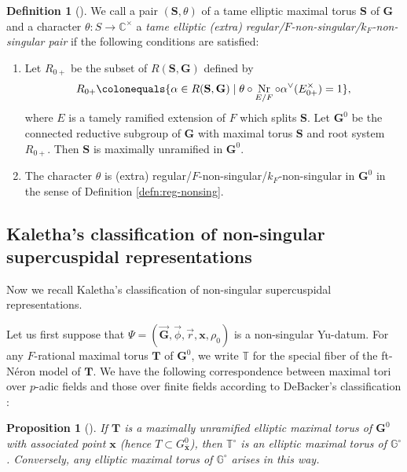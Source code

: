 \documentclass{amsart}
\newcommand{\bfT}{\mathbf{T}}
\newcommand{\x}{\mathbf{x}}
\newcommand{\bbT}{\mathbb{T}}
\newcommand{\C}{\mathbb{C}}
\newcommand{\bbG}{\mathbb{G}}
\newcommand{\bfG}{\mathbf{G}}
\newcommand{\bfS}{\mathbf{S}}
\DeclareMathOperator{\Nr}{Nr}
\theoremstyle{plain}
\newtheorem{prop}[thm]{Proposition}
\theoremstyle{definition}
\newtheorem{defn}[thm]{Definition}
\theoremstyle{remark}
\theoremstyle{theorem}
\begin{document}
\begin{defn}[{\cite[Definition 3.4.1]{Kal19-sc}}]\label{defn:non-sing-pair}
We call a pair $(\bfS,\theta)$ of a tame elliptic maximal torus $\bfS$ of $\bfG$ and a character $\theta\colon S\rightarrow\C^{\times}$ a \textit{tame elliptic (extra) regular/$F$-non-singular/$k_{F}$-non-singular pair} if the following conditions are satisfied:
\begin{enumerate}
\item
Let $R_{0+}$ be the subset of $R(\bfS,\bfG)$ defined by
\[
R_{0+}\colonequals \{\alpha\in R(\bfS,\bfG) \mid \theta\circ\Nr_{E/F}\circ\alpha^{\vee}(E_{0+}^{\times})=1\},
\]
where $E$ is a tamely ramified extension of $F$ which splits $\bfS$.
Let $\bfG^{0}$ be the connected reductive subgroup of $\bfG$ with maximal torus $\bfS$ and root system $R_{0+}$.
Then $\bfS$ is maximally unramified in $\bfG^{0}$.
\item
The character $\theta$ is (extra) regular/$F$-non-singular/$k_{F}$-non-singular in $\bfG^{0}$ in the sense of Definition \ref{defn:reg-nonsing}.
\end{enumerate}
\end{defn}

\subsection{Kaletha's classification of non-singular supercuspidal representations}\label{subsec:sssc}
Now we recall Kaletha's classification of non-singular supercuspidal representations.

Let us first suppose that $\Psi=(\vec{\bfG},\vec{\phi},\vec{r},\x,\rho_{0})$ is a non-singular Yu-datum.
For any $F$-rational maximal torus $\bfT$ of $\bfG^{0}$, we write $\mathbb{T}$ for the special fiber of the ft-N\'eron model of $\bfT$.
We have the following correspondence between maximal tori over $p$-adic fields and those over finite fields according to DeBacker's classification \cite{DeB06}:

\begin{prop}[{\cite[Lemma 3.4.4]{Kal19}}]\label{prop:DeBacker-Kaletha}
If $\bfT$ is a maximally unramified elliptic maximal torus of $\bfG^{0}$ with associated point $\x$ (hence $T\subset G^{0}_{\bar{\x}}$), then $\bbT^{\circ}$ is an elliptic maximal torus of $\bbG^{\circ}$.
Conversely, any elliptic maximal torus of $\bbG^{\circ}$ arises in this way.
\end{prop}
\end{document}
